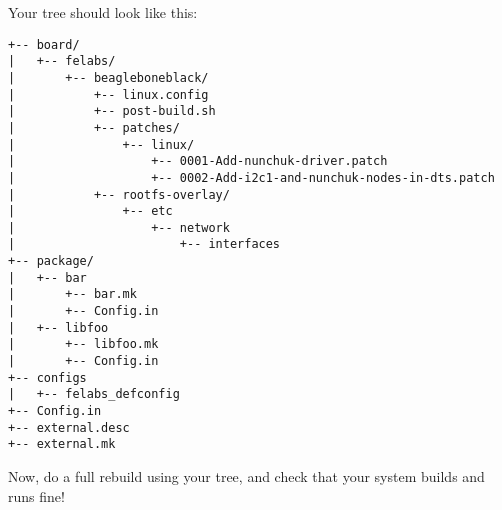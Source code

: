 Your  tree should look like this:

\begin{verbatim}
+-- board/
|   +-- felabs/
|       +-- beagleboneblack/
|           +-- linux.config
|           +-- post-build.sh
|           +-- patches/
|               +-- linux/
|                   +-- 0001-Add-nunchuk-driver.patch
|                   +-- 0002-Add-i2c1-and-nunchuk-nodes-in-dts.patch
|           +-- rootfs-overlay/
|               +-- etc
|                   +-- network
|                       +-- interfaces
+-- package/
|   +-- bar
|       +-- bar.mk
|       +-- Config.in
|   +-- libfoo
|       +-- libfoo.mk
|       +-- Config.in
+-- configs
|   +-- felabs_defconfig
+-- Config.in
+-- external.desc
+-- external.mk
\end{verbatim}

Now, do a full rebuild using your  tree, and check
that your system builds and runs fine!

